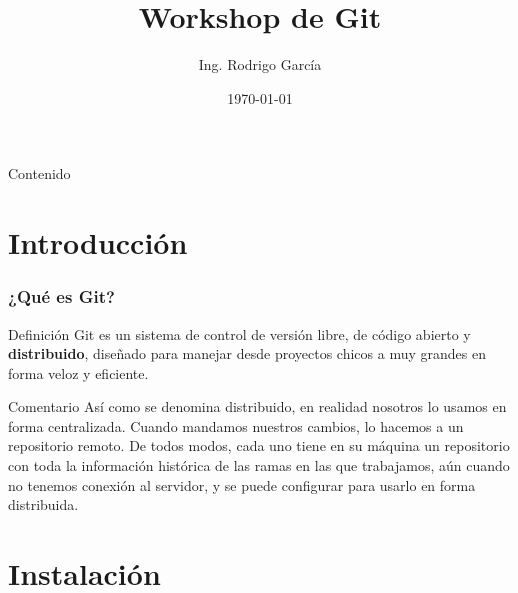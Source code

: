 \documentclass{beamer}
\begin{document}
\title{Workshop de Git}  
\author{Ing. Rodrigo García}
\date{\today} 

\begin{frame}
\titlepage
\end{frame}

\begin{frame}{Contenido}
\begin{multicols}{2}
\tableofcontents
\end{multicols}
\end{frame}

\section{Introducción} 

\begin{frame}\frametitle{¿Qué es Git?} 
  \begin{block}{Definición}
    Git es un sistema de control de versión libre, de código abierto y \textbf{distribuido}, diseñado
    para manejar desde proyectos chicos a muy grandes en forma veloz y eficiente. \footnotemark
  \end{block} \pause
  
  \begin{block}{Comentario}
    Así como se denomina distribuido, en realidad nosotros lo usamos en forma centralizada. Cuando mandamos nuestros cambios,
    lo hacemos a un repositorio remoto. De todos modos, cada uno tiene en su máquina un repositorio con toda la información
    histórica de las ramas en las que trabajamos, aún cuando no tenemos conexión al servidor, y se puede configurar para usarlo en forma
    distribuida. 
  \end{block}
\end{frame}

\section{Instalación}
\end{document}
